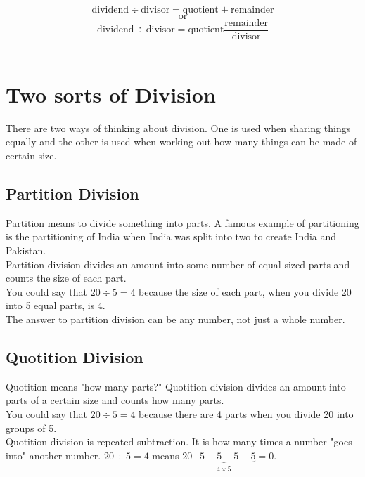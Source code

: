 \documentclass{article}
\begin{document}
$$\textrm{dividend} \div \textrm{divisor} = \textrm{quotient} + \textrm{remainder}$$
$$\textrm{or}$$
$$\textrm{dividend} \div \textrm{divisor} = \textrm{quotient} \frac{\textrm{remainder}}{\textrm{divisor}}$$\\

\section{Two sorts of Division}

There are two ways of thinking about division. One is used when sharing things equally and the other is used when working out how many things can be made of certain size.\\

\subsection*{Partition Division}

Partition means to divide something into parts. A famous example of partitioning is the partitioning of India when India was split into two to create India and Pakistan.\\

Partition division divides an amount into some number of equal sized parts and counts the size of each part.\\

You could say that $20 \div 5 = 4$ because the size of each part, when you divide 20 into 5 equal parts, is 4.\\

The answer to partition division can be any number, not just a whole number.\\

\subsection*{Quotition Division}

Quotition means "how many parts?" Quotition division divides an amount into parts of a certain size and counts how many parts.\\

You could say that $20 \div 5 = 4$ because there are 4 parts when you divide 20 into groups of 5.\\

Quotition division is repeated subtraction. It is how many times a number "goes into" another number. $20 \div 5 = 4$ means $20 \underbrace{- 5 - 5 - 5 - 5}_{4 \times 5} = 0$.\\
\end{document}
